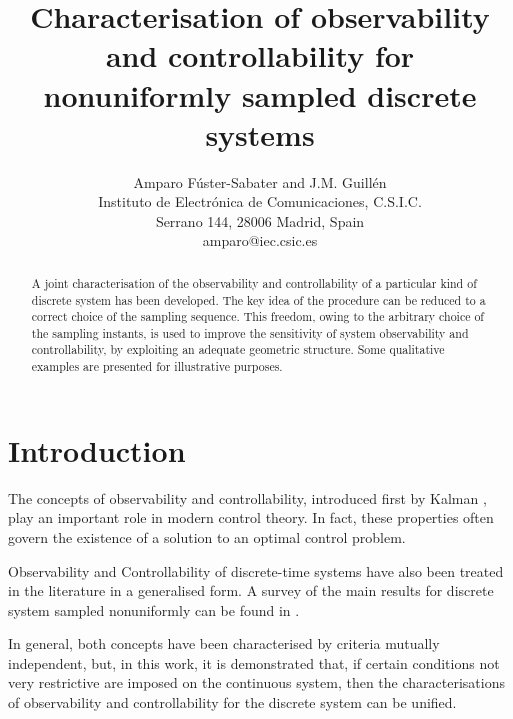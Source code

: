 \documentclass{article}
\begin{document}
\title{Characterisation of observability and controllability for nonuniformly sampled discrete systems}
\date{}
\author{Amparo F\'{u}ster-Sabater and J.M. Guill\'en\\
{\small Instituto de Electr\'onica de Comunicaciones, C.S.I.C.}\\
{\small Serrano 144, 28006 Madrid, Spain} \\
{\small amparo@iec.csic.es}}

\maketitle

\begin{abstract}

A joint characterisation of the observability and controllability
of a particular kind of discrete system has been developed. The
key idea of the procedure can be reduced to a correct choice of
the sampling sequence. This freedom, owing to the arbitrary choice
of the sampling instants, is used to improve the sensitivity of
system observability and controllability, by exploiting an
adequate geometric structure. Some qualitative examples are
presented for illustrative purposes.



\end{abstract}


\section{Introduction}
The concepts of observability and controllability, introduced
first by Kalman \cite{Kalman}, play an important role in modern
control theory. In fact, these properties often govern the
existence of a solution to an optimal control problem.

Observability and Controllability of discrete-time systems have
also been treated in the literature in a generalised form. A
survey of the main results for discrete system sampled
nonuniformly can be found in \cite{Troch}.

In general, both concepts have been characterised by criteria
mutually independent, but, in this work, it is demonstrated that,
if certain conditions not very restrictive are imposed on the
continuous system, then the characterisations of observability and
controllability for the discrete system can be unified.
\end{document}
